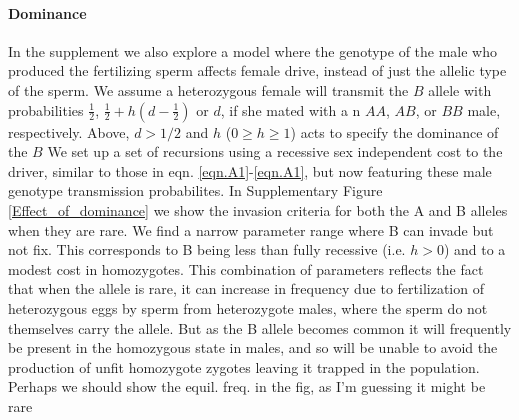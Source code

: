 \documentclass[12pt,letterpaper]{article}
\newcommand{\gc}[1]{{ \color{red} #1}}
\begin{document}
\paragraph{Dominance} In the supplement we also explore a model where
the genotype of the male who produced the fertilizing sperm affects female drive,
instead of just the allelic type of the sperm.
 We assume a heterozygous female will transmit the $B$ allele 
  with probabilities  $\frac{1}{2}$,  $\frac{1}{2} + h(d-\frac{1}{2}) $ or $d$, 
 if she mated with a n $AA$, $AB$, or $BB$ male,  respectively.
 Above, $d > 1/2$ and $h$ ($0 \geq h \geq 1$) acts to specify the dominance of the $B$
We set up a set of recursions using a recessive sex independent cost to
the driver, similar to those in eqn.
\ref{eqn.A1}-\ref{eqn.A1}, but now featuring these male genotype
transmission probabilites. In Supplementary Figure \ref{Effect_of_dominance} we show the invasion
criteria for both the A and B alleles when they are rare. 
We find a narrow parameter range where B 
can invade but not fix.
This corresponds to B being less than fully recessive (i.e. $h>0$) and to a modest cost in homozygotes. 
This combination of parameters reflects the fact that when the allele is rare, 
it can increase in frequency due to fertilization of heterozygous eggs
by sperm from heterozygote males, where the sperm do not themselves
carry the allele. But as the B allele becomes common it will frequently be
present in the homozygous state in males, and so will be unable to
avoid the production of unfit homozygote zygotes leaving it trapped in
the population. \gc{Perhaps we should show the equil. freq. in the
  fig, as I'm guessing it might be rare}
\end{document}
